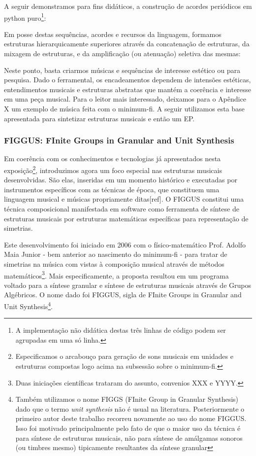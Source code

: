 A seguir demonstramos para fins didáticos, a construção de acordes periódicos em
python puro\footnote{A implementação não didática destas três linhas de código
podem ser agrupadas em uma só linha.}:


Em posse destas sequências, acordes e recursos da linguagem,
formamos estruturas hierarquicamente superiores
através da concatenação de estruturas, da mixagem de estruturas, e da amplificação
(ou atenuação) seletiva das mesmas:


Neste ponto, basta criarmos músicas e sequências de interesse estético ou para pesquisa. Dado o ferramental, os encadeamentos dependem de intensões estéticas, entendimentos musicais e estruturas abstratas que mantém a coerência e interesse em uma peça musical. Para o leitor mais interessado, deixamos para o Apêndice X um exemplo de música feita com o minimum-fi. A seguir utilizamos esta base apresentada para sintetizar estruturas musicais e então um EP.

\vspace{10 mm}

        \subsubsection{FIGGUS: FInite Groups in Granular and Unit Synthesis}

Em coerência com os conhecimentos
e tecnologias já apresentados nesta exposição\footnote{Especificamos o arcabouço para geração de sons musicais em unidades
e estruturas compostas logo acima na subsessão sobre o minimum-fi.}, introduzimos agora
um foco especial nas estruturas musicais
desenvolvidas. São elas, inseridas em um momento histórico e
executadas por instrumentos específicos com as técnicas de época,
que constituem uma linguagem musical e músicas propriamente
ditas[ref]. O FIGGUS constitui uma técnica composicional
manifestada em software como ferramenta de síntese de
estruturas musicais por estruturas matemáticas específicas
para representação de simetrias.

Este desenvolvimento foi iniciado em 2006 com o físico-matemático Prof. Adolfo Maia Junior - bem anterior
ao nascimento do minimum-fi - para
tratar de simetrias na música com vistas à composição musical através
de métodos matemáticos\footnote{Duas iniciações científicas trataram do assunto, convenios XXX e YYYY.}. Mais especificamente, a proposta resultou em
um programa voltado para a síntese
granular e síntese de estruturas musicais através de Grupos Algébricos. O nome dado
foi FIGGUS, sigla de FInite Groups in Granular and Unit Synthesis\footnote{Também utilizamos
o nome FIGGS (FInite Group in Granular Synthesis) dado que o termo \emph{unit synthesis} não
é usual na literatura. Posteriormente o primeiro autor deste trabalho recorreu novamente
ao uso do nome FIGGUS. Isso foi motivado principalmente pelo fato de que
o maior uso da técnica é para síntese de estruturas musicais, não para
síntese de amálgamas sonoros (ou timbres mesmo) tipicamente resultantes da síntese granular}.

